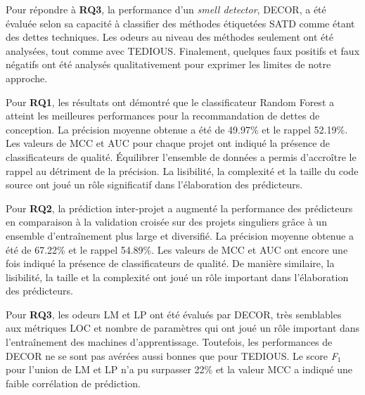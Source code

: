 Pour r\'{e}pondre \`{a} \textbf{RQ3}, la performance d'un \emph{smell detector}, \ac{DECOR}, a \'{e}t\'{e} \'{e}valu\'{e}e selon sa capacit\'{e} \`{a} classifier des m\'{e}thodes \'{e}tiquet\'{e}es \ac{SATD} comme \'{e}tant des dettes techniques. Les odeurs au niveau des m\'{e}thodes seulement ont \'{e}t\'{e} analys\'{e}es, tout comme avec \ac{TEDIOUS}. Finalement, quelques faux positifs et faux n\'{e}gatifs ont \'{e}t\'{e} analys\'{e}s qualitativement pour exprimer les limites de notre approche. \par

Pour \textbf{RQ1}, les r\'{e}sultats ont d\'{e}montr\'{e} que le classificateur Random Forest a atteint les meilleures performances pour la recommandation de dettes de conception. La pr\'{e}cision moyenne obtenue a \'{e}t\'{e} de 49.97\% et le rappel 52.19\%. Les valeurs de \ac{MCC} et \ac{AUC} pour chaque projet ont indiqu\'{e} la pr\'{e}sence de classificateurs de qualit\'{e}. \'{E}quilibrer l'ensemble de donn\'{e}es a permis d'accro\^{i}tre le rappel au d\'{e}triment de la pr\'{e}cision. La lisibilit\'{e}, la complexit\'{e} et la taille du code source ont jou\'{e} un r\^{o}le significatif dans l'\'{e}laboration des pr\'{e}dicteurs. \par

Pour \textbf{RQ2}, la pr\'{e}diction inter-projet a augment\'{e} la performance des pr\'{e}dicteurs en comparaison \`{a} la validation crois\'{e}e sur des projets singuliers gr\^{a}ce \`{a} un ensemble d'entra\^{i}nement plus large et diversifi\'{e}. La pr\'{e}cision moyenne obtenue a \'{e}t\'{e} de 67.22\% et le rappel 54.89\%. Les valeurs de \ac{MCC} et \ac{AUC} ont encore une fois indiqu\'{e} la pr\'{e}sence de classificateurs de qualit\'{e}. De mani\`{e}re similaire, la lisibilit\'{e}, la taille et la complexit\'{e} ont jou\'{e} un r\^{o}le important dans l'\'{e}laboration des pr\'{e}dicteurs. \par

Pour \textbf{RQ3}, les odeurs \ac{LM} et \ac{LP} ont \'{e}t\'{e} \'{e}valu\'{e}s par \ac{DECOR}, tr\`{e}s semblables aux m\'{e}triques \ac{LOC} et nombre de param\`{e}tres qui ont jou\'{e} un r\^{o}le important dans l'entra\^{i}nement des machines d'apprentissage. Toutefois, les performances de \ac{DECOR} ne se sont pas av\'{e}r\'{e}es aussi bonnes que pour \ac{TEDIOUS}. Le score \emph{F$_{1}$} pour l'union de \ac{LM} et \ac{LP} n'a pu surpasser 22\% et la valeur \ac{MCC} a indiqu\'{e} une faible corr\'{e}lation de pr\'{e}diction. \par

